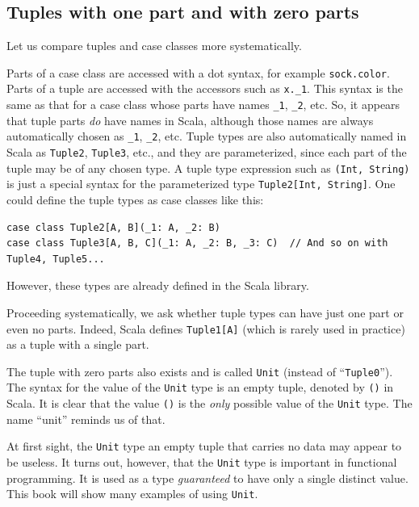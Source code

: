 \subsection{Tuples with one part and with zero parts}

Let us compare tuples and case classes more systematically.

Parts of a case class are accessed with a dot syntax, for example
\lstinline!sock.color!. Parts of a tuple are accessed with the accessors
such as \lstinline!x._1!. This syntax is the same as that for a case
class whose parts have names \lstinline!_1!, \lstinline!_2!, etc.
So, it appears that tuple parts \emph{do} have names in Scala, although
those names are always automatically chosen as \lstinline!_1!, \lstinline!_2!,
etc. Tuple types are also automatically named in Scala as \lstinline!Tuple2!,
\lstinline!Tuple3!, etc., and they are parameterized, since each
part of the tuple may be of any chosen type. A tuple type expression
such as \lstinline!(Int, String)! is just a special syntax for the
parameterized type \lstinline!Tuple2[Int, String]!. One could define
the tuple types as case classes like this:
\begin{lstlisting}
case class Tuple2[A, B](_1: A, _2: B)
case class Tuple3[A, B, C](_1: A, _2: B, _3: C)  // And so on with Tuple4, Tuple5...
\end{lstlisting}
However, these types are already defined in the Scala library.

Proceeding systematically, we ask whether tuple types can have just
one part or even no parts. Indeed, Scala defines \lstinline!Tuple1[A]!
(which is rarely used in practice) as a tuple with a single part.

The tuple with zero parts also exists and is called \lstinline!Unit!
(instead of \textsf{``}\lstinline!Tuple0!\textsf{''}). The syntax for the value of
the \lstinline!Unit! type is an empty tuple, denoted by \lstinline!()!
in Scala. It is clear that the value \lstinline!()! is the \emph{only}
possible value of the \lstinline!Unit! type. The name \textsf{``}unit\textsf{''}
reminds us of that. 

At first sight, the \lstinline!Unit! type \textemdash{} an empty
tuple that carries no data \textemdash{} may appear to be useless.
It turns out, however, that the \lstinline!Unit! type is important
in functional programming. It is used as a type \emph{guaranteed}
to have only a single distinct value. This book will show many examples
of using \lstinline!Unit!.

